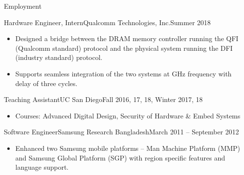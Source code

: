\begin{cvsection}{Employment}
	\begin{cvsubsection}{Hardware Engineer, Intern}{Qualcomm Technologies, Inc.}{Summer 2018}			
		\begin{itemize}
			\item Designed a bridge between the DRAM memory controller running the QFI (Qualcomm standard) protocol and the physical system running the DFI (industry standard) protocol.
			\item Supports seamless integration of the two systems at GHz frequency with delay of three cycles.
		\end{itemize}
	\end{cvsubsection}
	\begin{cvsubsection}{Teaching Assistant}{UC San Diego}{Fall 2016, 17, 18, Winter 2017, 18}	
		\begin{itemize}
			\item Courses: Advanced Digital Design, Security of Hardware \& Embed Systems
		\end{itemize}
	\end{cvsubsection}
	\begin{cvsubsection}{Software Engineer}{Samsung Research Bangladesh}{March 2011 -- September 2012}		
		\begin{itemize}
			\item Enhanced two Samsung mobile platforms -- Man Machine Platform (MMP) and Samsung Global Platform (SGP) with region specific features and language support.
		\end{itemize}
	\end{cvsubsection}
\end{cvsection} 
